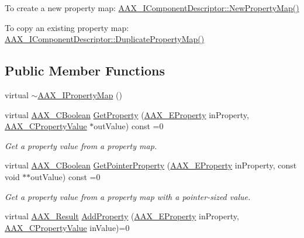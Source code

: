 \begin{DoxyItemize}
\item To create a new property map\+: \mbox{\hyperlink{a01781_a0d7dd21daa8bc588d6a1145c3eb7ef98}{A\+A\+X\+\_\+\+I\+Component\+Descriptor\+::\+New\+Property\+Map()}}
\item To copy an existing property map\+: \mbox{\hyperlink{a01781_a107f2d11ba9165ef84162a76368f6ee6}{A\+A\+X\+\_\+\+I\+Component\+Descriptor\+::\+Duplicate\+Property\+Map()}} 
\end{DoxyItemize}\subsection*{Public Member Functions}
\begin{DoxyCompactItemize}
\item 
virtual \mbox{\hyperlink{a01869_af8a29fbaf587471266dee3968be0b698}{$\sim$\+A\+A\+X\+\_\+\+I\+Property\+Map}} ()
\item 
virtual \mbox{\hyperlink{a00392_aa216506530f1d19a2965931ced2b274b}{A\+A\+X\+\_\+\+C\+Boolean}} \mbox{\hyperlink{a01869_a451fcba9a3223f6686a8adb125d134bf}{Get\+Property}} (\mbox{\hyperlink{a00662_a13e384f22825afd3db6d68395b79ce0d}{A\+A\+X\+\_\+\+E\+Property}} in\+Property, \mbox{\hyperlink{a00392_ab247c0d8686c14e05cbb567ef276f249}{A\+A\+X\+\_\+\+C\+Property\+Value}} $\ast$out\+Value) const =0
\begin{DoxyCompactList}\small\item\em Get a property value from a property map. \end{DoxyCompactList}\item 
virtual \mbox{\hyperlink{a00392_aa216506530f1d19a2965931ced2b274b}{A\+A\+X\+\_\+\+C\+Boolean}} \mbox{\hyperlink{a01869_a3990a31fd831975a2ff410213593ebef}{Get\+Pointer\+Property}} (\mbox{\hyperlink{a00662_a13e384f22825afd3db6d68395b79ce0d}{A\+A\+X\+\_\+\+E\+Property}} in\+Property, const void $\ast$$\ast$out\+Value) const =0
\begin{DoxyCompactList}\small\item\em Get a property value from a property map with a pointer-\/sized value. \end{DoxyCompactList}\item 
virtual \mbox{\hyperlink{a00392_a4d8f69a697df7f70c3a8e9b8ee130d2f}{A\+A\+X\+\_\+\+Result}} \mbox{\hyperlink{a01869_a0997671afce9a2367662c764c1d055dd}{Add\+Property}} (\mbox{\hyperlink{a00662_a13e384f22825afd3db6d68395b79ce0d}{A\+A\+X\+\_\+\+E\+Property}} in\+Property, \mbox{\hyperlink{a00392_ab247c0d8686c14e05cbb567ef276f249}{A\+A\+X\+\_\+\+C\+Property\+Value}} in\+Value)=0
$$
\end{DoxyCompactItemize}
